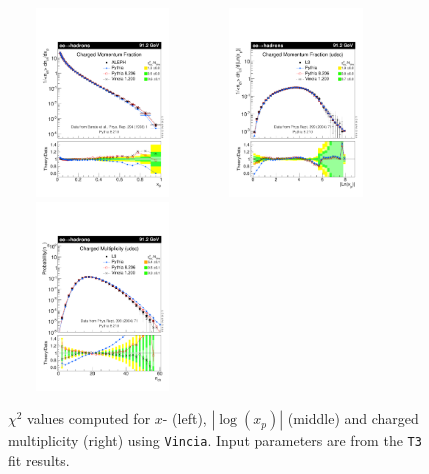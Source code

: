 \documentclass[aps,preprint,floatfix,nofootinbib,showpacs]{revtex4-1}
\begin{document}
   \begin{figure}[!h]
 \centering
 \includegraphics[width=5cm, height=5cm]{Vincia-T3/vincia03-x.pdf}
 \hfill
 \includegraphics[width=5cm, height=5cm]{Vincia-T3/vincia03-Lnx.pdf}
 \hfill
 \includegraphics[width=5cm, height=5cm]{Vincia-T3/vincia03-Nch.pdf}
 \caption{$\chi^2$ values computed for $x$- (left), $|\log(x_p)|$ (middle) and charged multiplicity (right) using
 \texttt{Vincia}. Input parameters are from the \texttt{T3} fit results.}
 \label{Chi2-3}
 \end{figure}
 
\end{document}
